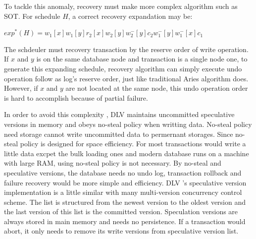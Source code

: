 \documentclass[conference]{IEEEtran}
\begin{document}
To tackle this anomaly, recovery must make more complex algorithm such as SOT\cite{UnifyCR:journals/is/AlonsoVABASW94}.
For schedule ${H}$, a correct recovery expandation may be: 
\begin{center}
${exp^*(H) = w_1[x]w_1[y]r_2[x]w_2[y]w^-_2[y]c_2w^-_1[y]w^-_1[x]c_1}$
\end{center}
The schdeuler must recovery transaction by the reserve order of write operation.
If ${x}$ and ${y}$ is on the same database node and transaction is a single node one, to generate this expanding schedule, recovery algorithm can simply execute undo operation follow as log's reserve order, just like traditional Aries algorithm does.
However, if ${x}$ and ${y}$ are not located at the same node, this undo operation order is hard to accomplish because of partial failure.

In order to avoid this complexity , DLV maintains uncommitted speculative versions in memory and obeys no-steal policy when writting data.
No-steal policy need storage cannot write  uncommitted data to permernant storages.
Since no-steal policy is designed for space efficiency.
For most transactions would write a little data excpet the bulk loading ones and
modern database runs on a machine with large RAM, using no-steal policy is not necessary. 
By no-steal and speculative versions, the database needs no undo log, transaction rollback and failure recovery would be more simple and efficiency.
DLV 's speculative version implementation is a little similar with many multi-version concurrency control scheme.
The list is structured from the newest version to the oldest version and the last version of this list is the committed version.
Speculation versions are always stored in main memory and needs no persistence.
If a transaction would abort, it only needs to remove its write versions from speculative version list.
\end{document}
